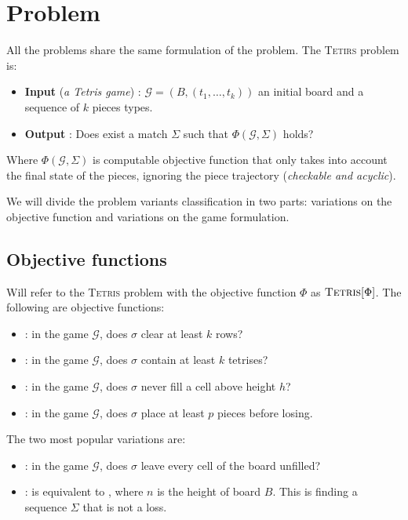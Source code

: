\section{Problem}

All the problems share the same formulation of the problem. The \textsc{Tetirs} problem is:

\begin{itemize}
  \item \textbf{Input} (\textit{a Tetris game}) : $\mathcal{G} = (B,(t_1,\dots,t_k))$ an initial board and a sequence of $k$ pieces types.
  
  \item \textbf{Output} : Does exist a match $\Sigma$ such that $\Phi ( \mathcal{G}, \Sigma )$ holds? 
\end{itemize}

Where $\Phi(\mathcal{G},\Sigma)$ is computable objective function that only takes into account the final state of the pieces, ignoring the piece trajectory (\emph{checkable and acyclic}). 


We will divide the problem variants classification in two parts: variations on the objective function and variations on the game formulation.

\subsection{Objective functions} 

Will refer to the \textsc{Tetris} problem with the objective function $\Phi$ as $\textsc{Tetris} [ \Phi ]$. The following are objective functions:

\begin{itemize}
  \item {}: in the game $\mathcal{G}$, does $\sigma$ clear at least $k$ rows?
  \item {}: in the game $\mathcal{G}$, does $\sigma$ contain at least $k$ tetrises?
  \item {}: in the game $\mathcal{G}$, does $\sigma$ never fill a cell above height $h$?
  \item {}: in the game $\mathcal{G}$, does $\sigma$ place at least $p$ pieces before losing.
\end{itemize} 

The two most popular variations are:

\begin{itemize} 
  \item \clearing: in the game $\mathcal{G}$, does $\sigma$ leave every cell of the board unfilled?
  \item \survival: is equivalent to , where $n$ is the height of board $B$. This is finding a sequence $\Sigma$ that is not a loss.
\end{itemize}

